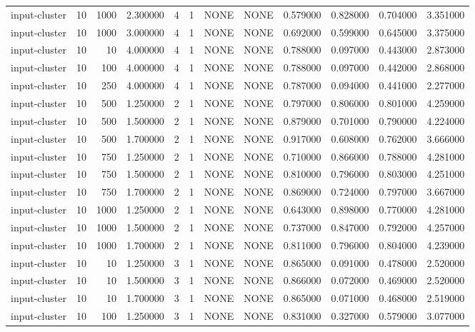 \begin{tabular}{lrrrllllrrrr}
input-cluster & 10 & 1000 & 2.300000 & 4 & 1 & NONE & NONE & 0.579000 & 0.828000 & 0.704000 & 3.351000 \\
input-cluster & 10 & 1000 & 3.000000 & 4 & 1 & NONE & NONE & 0.692000 & 0.599000 & 0.645000 & 3.375000 \\
input-cluster & 10 & 10 & 4.000000 & 4 & 1 & NONE & NONE & 0.788000 & 0.097000 & 0.443000 & 2.873000 \\
input-cluster & 10 & 100 & 4.000000 & 4 & 1 & NONE & NONE & 0.788000 & 0.097000 & 0.442000 & 2.868000 \\
input-cluster & 10 & 250 & 4.000000 & 4 & 1 & NONE & NONE & 0.787000 & 0.094000 & 0.441000 & 2.277000 \\
input-cluster & 10 & 500 & 1.250000 & 2 & 1 & NONE & NONE & 0.797000 & 0.806000 & 0.801000 & 4.259000 \\
input-cluster & 10 & 500 & 1.500000 & 2 & 1 & NONE & NONE & 0.879000 & 0.701000 & 0.790000 & 4.224000 \\
input-cluster & 10 & 500 & 1.700000 & 2 & 1 & NONE & NONE & 0.917000 & 0.608000 & 0.762000 & 3.666000 \\
input-cluster & 10 & 750 & 1.250000 & 2 & 1 & NONE & NONE & 0.710000 & 0.866000 & 0.788000 & 4.281000 \\
input-cluster & 10 & 750 & 1.500000 & 2 & 1 & NONE & NONE & 0.810000 & 0.796000 & 0.803000 & 4.251000 \\
input-cluster & 10 & 750 & 1.700000 & 2 & 1 & NONE & NONE & 0.869000 & 0.724000 & 0.797000 & 3.667000 \\
input-cluster & 10 & 1000 & 1.250000 & 2 & 1 & NONE & NONE & 0.643000 & 0.898000 & 0.770000 & 4.281000 \\
input-cluster & 10 & 1000 & 1.500000 & 2 & 1 & NONE & NONE & 0.737000 & 0.847000 & 0.792000 & 4.257000 \\
input-cluster & 10 & 1000 & 1.700000 & 2 & 1 & NONE & NONE & 0.811000 & 0.796000 & 0.804000 & 4.239000 \\
input-cluster & 10 & 10 & 1.250000 & 3 & 1 & NONE & NONE & 0.865000 & 0.091000 & 0.478000 & 2.520000 \\
input-cluster & 10 & 10 & 1.500000 & 3 & 1 & NONE & NONE & 0.866000 & 0.072000 & 0.469000 & 2.520000 \\
input-cluster & 10 & 10 & 1.700000 & 3 & 1 & NONE & NONE & 0.865000 & 0.071000 & 0.468000 & 2.519000 \\
input-cluster & 10 & 100 & 1.250000 & 3 & 1 & NONE & NONE & 0.831000 & 0.327000 & 0.579000 & 3.077000 \\

\end{tabular}
